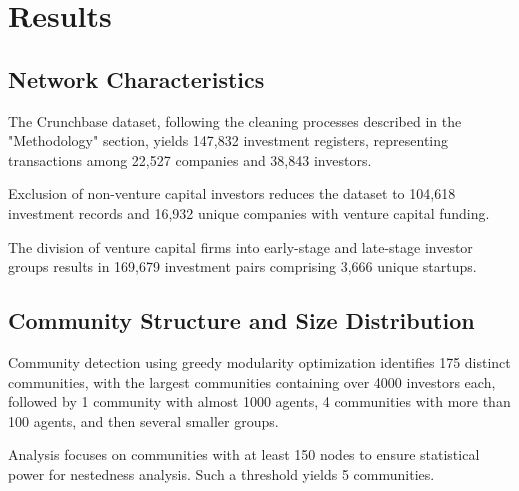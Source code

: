 \section{Results}

\subsection{Network Characteristics}

\newcommand{\numCompanies}{22,527}
\newcommand{\numInvestors}{38,843}
\newcommand{\numInvestments}{147,832}
\newcommand{\numFundingRounds}{268,283}

The Crunchbase dataset, following the cleaning processes described in the "Methodology" section, yields \numInvestments{} investment registers, representing transactions among \numCompanies{} companies and \numInvestors{} investors.


\newcommand{\numVCInvestments}{104,618}
\newcommand{\numCompaniesWithVCFund}{16,932}

Exclusion of non-venture capital investors reduces the dataset to \numVCInvestments{} investment records and \numCompaniesWithVCFund{} unique companies with venture capital funding.

\newcommand{\invPairs}{169,679}
\newcommand{\invPairsUniqueStartups}{3,666}

The division of venture capital firms into early-stage and late-stage investor groups results in \invPairs{} investment pairs comprising \invPairsUniqueStartups{} unique startups.


\newcommand{\numCommunities}{175}
\newcommand{\numTopCommunities}{5}
\newcommand{\numCommunitiesThreshold}{150}

\subsection{Community Structure and Size Distribution}

Community detection using greedy modularity optimization identifies \numCommunities{} distinct communities, with the largest communities containing over 4000 investors each, followed by 1 community with almost 1000 agents, 4 communities with more than 100 agents, and then several smaller groups.

Analysis focuses on communities with at least \numCommunitiesThreshold{} nodes to ensure statistical power for nestedness analysis. Such a threshold yields \numTopCommunities{} communities.

